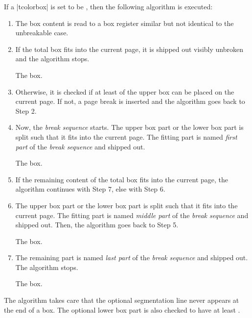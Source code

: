 {
If a |tcolorbox| is set to be , then the following
algorithm is executed:
\begin{enumerate}
\item The box content is read to a box register similar but not identical
  to the unbreakable case.
\item If the total box fits into the current page, it is shipped out visibly
  unbroken and the algorithm stops.
  \begin{tcolorbox}[title=Unbroken Box,watermark text=unbroken]
  The box.
  \end{tcolorbox}
\item Otherwise, it is checked if at least 
  of the upper box can be placed on the current page.
  If not, a page break is inserted and the algorithm goes back to Step 2.
\item Now, the \emph{break sequence} starts.
  The upper box part or the lower box part is split such that it fits
  into the current page. The fitting part is named \emph{first part} of
  the \emph{break sequence} and shipped out.
  \begin{tcolorbox}[title=Broken Box,watermark text=first,skin=enhancedfirst]
  The box.
  \end{tcolorbox}
\item
  If the remaining content of the total box
  fits into the current page, the algorithm continues with Step 7, else
  with Step 6.
\item
  The upper box part or the lower box part is split such that it fits
  into the current page. The fitting part is named \emph{middle part} of
  the \emph{break sequence} and shipped out.
  Then, the algorithm goes back to Step 5.
  \begin{tcolorbox}[watermark text=middle,skin=enhancedmiddle]
  The box.
  \end{tcolorbox}
\item
  The remaining part is named \emph{last part} of
  the \emph{break sequence} and shipped out. The algorithm stops.
  \begin{tcolorbox}[watermark text=last,skin=enhancedlast]
  The box.
  \end{tcolorbox}
\end{enumerate}
}

The algorithm takes care that the optional segmentation line never appears at
the end of a box. The optional lower box part is also checked to
have at least .

